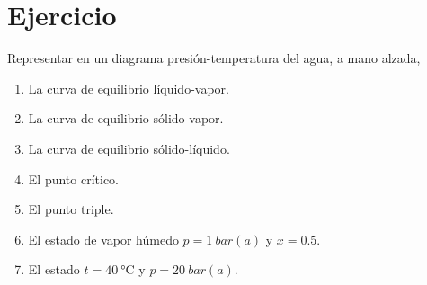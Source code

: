 \section{Ejercicio}\label{ej:Chap09Ejercicio01}
Representar en un diagrama presión-temperatura del agua, a mano alzada,
\begin{enumerate}
    \item La curva de equilibrio líquido-vapor.
    \item La curva de equilibrio sólido-vapor.
    \item La curva de equilibrio sólido-líquido.
    \item El punto crítico.
    \item El punto triple.
    \item El estado de vapor húmedo $p=\SI{1}{bar(a)}$ y $x=0.5$.
    \item El estado $t=\SI{40}{\celsius}$ y $p=\SI{20}{bar(a)}$.
\end{enumerate}